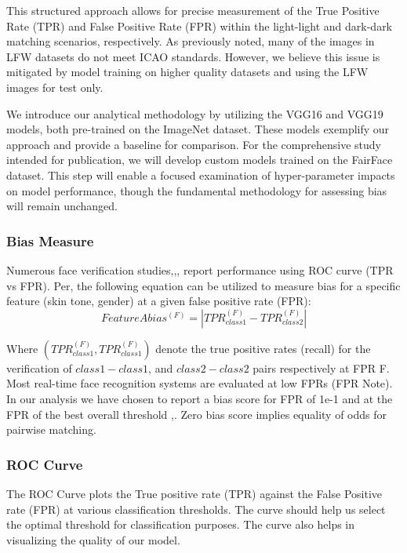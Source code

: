 \documentclass[conference]{IEEEtran}
\begin{document}
This structured approach allows for precise measurement of the True Positive Rate (TPR) and False Positive Rate (FPR) within the light-light and dark-dark matching scenarios, respectively. As previously noted, many of the images in LFW datasets do not meet ICAO standards. However, we believe this issue is mitigated by model training on higher quality datasets and using the LFW images for test only.

We introduce our analytical methodology by utilizing the VGG16 and VGG19 models, both pre-trained on the ImageNet\cite{deng2009imagenet} dataset. These models exemplify our approach and provide a baseline for comparison. For the comprehensive study intended for publication, we will develop custom models trained on the FairFace dataset\cite{karkkainen2021fairface}. This step will enable a focused examination of hyper-parameter impacts on model performance, though the fundamental methodology for assessing bias will remain unchanged.

\subsubsection{Bias Measure}
Numerous face verification studies\cite{deng2019arcface},\cite{ranjan2019fast},\cite{liu2017sphereface},\cite{dhar2019measuring} report performance using ROC curve (TPR vs FPR). Per\cite{dhar2022distill},\cite{dhar2021pass} the following equation can be utilized to measure bias for a specific feature (skin tone, gender) at a given false positive rate (FPR):
\begin{equation}
    {Feature A  bias^{(F)}=\left|TPR_{class1}^{(F)} - TPR_{class2}^{(F)}\right|} 
\end{equation}

Where $(TPR_{class1}^{(F)}, TPR_{class1}^{(F)})$ denote the true positive rates (recall) for the verification of $class1-class1$, and $class2-class2$ pairs respectively at FPR F. Most real-time face recognition systems are evaluated at low FPRs (FPR Note). In our analysis we have chosen to report a bias score for FPR of 1e-1 and at the FPR of the best overall threshold \cite{dhar2022distill},\cite{dhar2021pass}. Zero bias score implies equality of odds for pairwise matching.

\subsubsection{ROC Curve}
The ROC Curve plots the True positive rate (TPR) against the False Positive rate (FPR) at various classification thresholds. The curve should help us select the optimal threshold for classification purposes. The curve also helps in visualizing the  quality of our model. 
\end{document}

